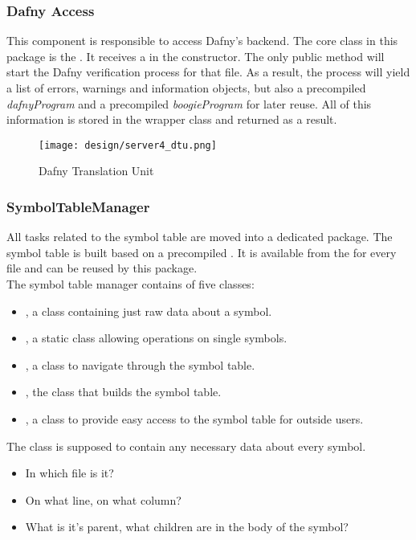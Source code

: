 \subsubsection{Dafny Access}
This component is responsible to access Dafny's backend.
The core class in this package is the \linebreak {}.
It receives a  in the constructor.
The only public method  will start the Dafny verification process for that file.
As a result, the process will yield a list of errors, warnings and information objects, but also a precompiled \textit{dafnyProgram} and a precompiled \textit{boogieProgram} for later reuse.
All of this information is stored in the  wrapper class and returned as a result.\\

\begin{figure}[H]
    \centering
    \texttt{[image: design/server4\_dtu.png]}
    \caption{Dafny Translation Unit}
    \label{fig:server_dtu}
\end{figure}


\subsubsection{SymbolTableManager}
All tasks related to the symbol table are moved into a dedicated package.
The symbol table is built based on a precompiled .
It is available from the  for every file and can be reused by this package.\\

The symbol table manager contains of five classes:
\begin{itemize}
    \item {}, a class containing just raw data about a symbol.
    \item {}, a static class allowing operations on single symbols.
    \item {}, a class to navigate through the symbol table.
    \item {}, the class that builds the symbol table.
    \item {}, a class to provide easy access to the symbol table for outside users.
\end{itemize}

The class  is supposed to contain any necessary data about every symbol.
\begin{itemize}
    \item In which file is it?
    \item On what line, on what column?
    \item What is it's parent, what children are in the body of the symbol?
\end{itemize}

